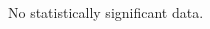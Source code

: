 \documentclass[conference]{IEEEtran}
\begin{document}
\begin{table*}[htb]
\begin{adjustbox}{width=\textwidth}
\end{adjustbox}
\end{table*}

\subsection{\RQTwo}
\begin{table*}[htb]
\begin{adjustbox}{width=\textwidth}
\end{adjustbox}
\end{table*}


\subsection{\RQThree}
\begin{table*}[htb]
\begin{adjustbox}{width=\textwidth}
\end{adjustbox}
\end{table*}


\subsection{\RQFour}
No statistically significant data.

\subsection{\RQFive}

\begin{table*}[htb]
\begin{adjustbox}{width=\textwidth}
\end{adjustbox}
\end{table*}

\subsection{\RQSix}
\end{document}
